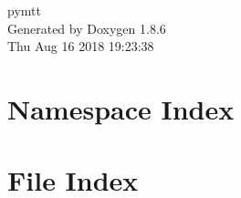 \documentclass[twoside]{book}
\newcommand{\clearemptydoublepage}{%
  \newpage{\pagestyle{empty}\cleardoublepage}%
}
\begin{document}
\hypersetup{pageanchor=false}
\begin{titlepage}
\vspace*{7cm}
\begin{center}%
{\Large pymtt }\\
\vspace*{1cm}
{\large Generated by Doxygen 1.8.6}\\
\vspace*{0.5cm}
{\small Thu Aug 16 2018 19:23:38}\\
\end{center}
\end{titlepage}
\clearemptydoublepage
\tableofcontents
\clearemptydoublepage
{}
\hypersetup{pageanchor=true}

\chapter{Namespace Index}

\chapter{File Index}

\end{document}
